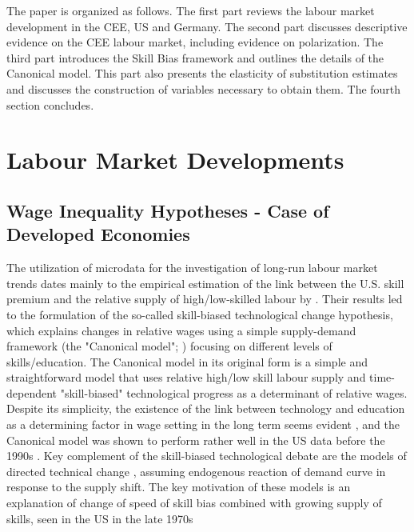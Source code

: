\documentclass[11pt]{article}
\begin{document}
The paper is organized as follows. The first part reviews the labour market development in the CEE, US and Germany. The second part discusses descriptive evidence on the CEE labour market, including evidence on polarization. The third part introduces the Skill Bias framework and outlines the details of the Canonical model. This part also presents the elasticity of substitution estimates and discusses the construction of variables necessary to obtain them. The fourth section concludes.

\section{Labour Market Developments}
\subsection{Wage Inequality Hypotheses - Case of Developed Economies}

The utilization of microdata for the investigation of long-run labour market trends dates mainly to the empirical estimation of the link between the U.S. skill premium and the relative supply of high/low-skilled labour by \citet{katz1992changes}. Their results led to the formulation of the so-called skill-biased technological change hypothesis, which explains changes in relative wages using a simple supply-demand framework (the "Canonical model"; \citealt{acemoglu2012does}) focusing on different levels of skills/education. The Canonical model in its original form is a simple and straightforward model that uses relative high/low skill labour supply and time-dependent "skill-biased" technological progress as a determinant of relative wages. Despite its simplicity, the existence of the link between technology and education as a determining factor in wage setting in the long term seems evident \citep{piketty2018capital}, and the Canonical model was shown to perform rather well in the US data before the 1990s \citep{katz1992changes}.
Key complement of the skill-biased technological debate are the models of directed technical change \citep{acemoglu2002directed, acemoglu2002technical}, assuming endogenous reaction of demand curve in response to the supply shift. The key motivation of these models is an explanation of change of speed of skill bias combined with growing supply of skills, seen in the US in the late 1970s \citep{acemoglu2002directed}
\end{document}
